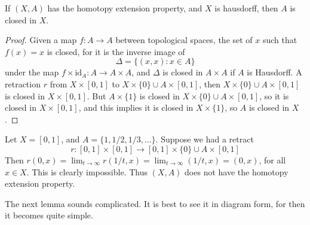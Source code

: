 \begin{theorem}
    If $(X,A)$ has the homotopy extension property, and $X$ is hausdorff, then $A$ is closed in $X$.
\end{theorem}
\begin{proof}
    Given a map $f: A \to A$ between topological spaces, the set of $x$ such that $f(x) = x$ is closed, for it is the inverse image of
    \[ \Delta = \{ (x,x) : x \in A \} \]
    under the map $f \times \text{id}_A: A \to A \times A$, and $\Delta$ is closed in $A \times A$ if $A$ is Hausdorff. A retraction $r$ from $X \times [0,1]$ to $X \times \{ 0 \} \cup A \times [0,1]$, then $X \times \{ 0 \} \cup A \times [0,1]$ is closed in $X \times [0,1]$. But $A \times \{ 1 \}$ is closed in $X \times \{ 0 \} \cup A \times [0,1]$, so it is closed in $X \times [0,1]$, and this implies it is closed in $X \times \{ 1 \}$, so $A$ is closed in $X$.
\end{proof}

\begin{example}
    Let $X = [0,1]$, and $A = \{ 1, 1/2, 1/3, \dots \}$. Suppose we had a retract
    \[ r: [0,1] \times [0,1] \to [0,1] \times \{ 0 \} \cup A \times [0,1] \]
    Then $r(0,x) = \lim_{t \to \infty} r(1/t, x) = \lim_{t \to \infty} (1/t,x) = (0,x)$, for all $x \in X$. This is clearly impossible. Thus $(X,A)$ does not have the homotopy extension property.
\end{example}

The next lemma sounds complicated. It is best to see it in diagram form, for then it becomes quite simple.

